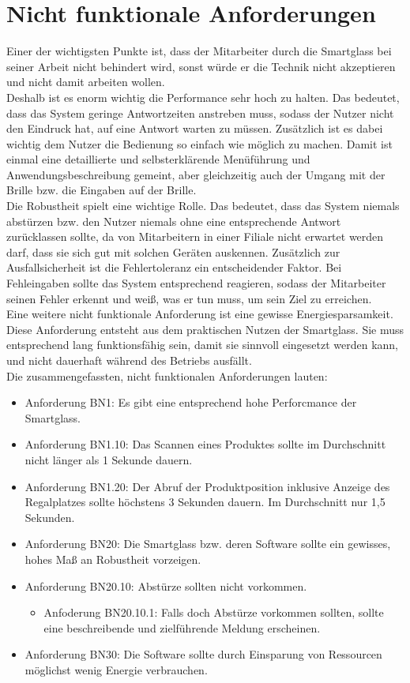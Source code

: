 \section{Nicht funktionale Anforderungen}
Einer der wichtigsten Punkte ist, dass der Mitarbeiter durch die Smartglass bei seiner Arbeit nicht behindert wird, sonst würde er die Technik nicht akzeptieren und nicht damit arbeiten wollen. \\
Deshalb ist es enorm wichtig die Performance sehr hoch zu halten. Das bedeutet, dass das System geringe Antwortzeiten anstreben muss, sodass der Nutzer nicht den Eindruck hat, auf eine Antwort warten zu müssen. 
Zusätzlich ist es dabei wichtig dem Nutzer die Bedienung so einfach wie möglich zu machen. Damit ist einmal eine detaillierte und selbsterklärende Menüführung und Anwendungsbeschreibung gemeint, aber gleichzeitig auch der Umgang mit der Brille bzw. die Eingaben auf der Brille. \\
Die Robustheit spielt eine wichtige Rolle. Das bedeutet, dass das System niemals abstürzen bzw. den Nutzer niemals ohne eine entsprechende Antwort zurücklassen sollte, da von Mitarbeitern in einer Filiale nicht erwartet werden darf, dass sie sich gut mit solchen Geräten auskennen. Zusätzlich zur Ausfallsicherheit ist die Fehlertoleranz ein entscheidender Faktor. Bei Fehleingaben sollte das System entsprechend reagieren, sodass der Mitarbeiter seinen Fehler erkennt und weiß, was er tun muss, um sein Ziel zu erreichen. \\
Eine weitere nicht funktionale Anforderung ist eine gewisse Energiesparsamkeit. Diese Anforderung entsteht aus dem praktischen Nutzen der Smartglass. Sie muss entsprechend lang funktionsfähig sein, damit sie sinnvoll eingesetzt werden kann, und nicht dauerhaft während des Betriebs ausfällt. 
\\
Die zusammengefassten, nicht funktionalen Anforderungen lauten:
\begin{itemize}
	\item Anforderung BN1: Es gibt eine entsprechend hohe Perforcmance der Smartglass. 
	\item Anforderung BN1.10: Das Scannen eines Produktes sollte im Durchschnitt nicht länger als 1 Sekunde dauern. 
	\item Anforderung BN1.20: Der Abruf der Produktposition inklusive Anzeige des Regalplatzes sollte höchstens 3 Sekunden dauern. Im Durchschnitt nur 1,5 Sekunden.
	\item Anforderung BN20: Die Smartglass bzw. deren Software sollte ein gewisses, hohes Maß an Robustheit vorzeigen.
	\item Anforderung BN20.10: Abstürze sollten nicht vorkommen. 
	\begin{itemize}
		\item Anfoderung BN20.10.1: Falls doch Abstürze vorkommen sollten, sollte eine beschreibende und zielführende Meldung erscheinen.
	\end{itemize}
	\item Anforderung BN30: Die Software sollte durch Einsparung von Ressourcen möglichst wenig Energie verbrauchen.
\end{itemize}